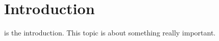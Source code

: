 \section{Introduction}
\label{sec:intro}

 is the introduction. This topic is about something really important. \cite{Yilmaz2020}

